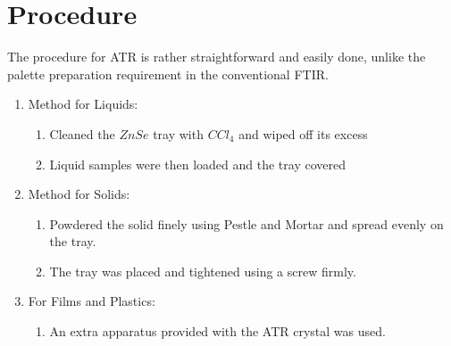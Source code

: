 \section{Procedure}
	The procedure for ATR is rather straightforward and easily done, unlike the palette preparation requirement in the conventional FTIR.
	\begin{enumerate}
		\item Method for Liquids:
		\begin{enumerate}
			\item Cleaned the $ZnSe$ tray with $CCl_{4}$ and wiped off its excess
			\item Liquid samples were then loaded and the tray covered
		\end{enumerate}
		\item Method for Solids:
		\begin{enumerate}
			\item Powdered the solid finely using Pestle and Mortar and spread evenly on the tray.
			\item The tray was placed and tightened using a screw firmly.
		\end{enumerate}
		\item For Films and Plastics:
		\begin{enumerate}
			\item An extra apparatus provided with the ATR crystal was used.
		\end{enumerate}
	\end{enumerate}

